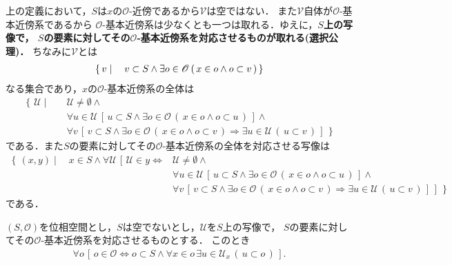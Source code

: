 	上の定義において，$S$は$x$の$\mathscr{O}$-近傍であるから$\mathscr{V}$は空ではない．
	また$\mathscr{V}$自体が$\mathscr{O}$-基本近傍系であるから
	$\mathscr{O}$-基本近傍系は少なくとも一つは取れる．ゆえに，{\bf $S$上の写像で，
	$S$の要素に対してその$\mathscr{O}$-基本近傍系を対応させるものが取れる(選択公理)．}
	ちなみに$\mathscr{V}$とは
	\begin{align}
		\left\{\, v \mid \quad v \subset S \wedge \exists o \in \mathscr{O}\, (\, x \in o \wedge o \subset v\, )\, \right\}
	\end{align}
	なる集合であり，$x$の$\mathscr{O}$-基本近傍系の全体は
	\begin{align}
		\left\{\, \mathscr{U} \mid \quad \right.
		&\mathscr{U} \neq \emptyset \wedge \\
		&\forall u \in \mathscr{U}\, [\, u \subset S \wedge \exists o \in \mathscr{O}\, (\, x \in o \wedge o \subset u\, )\, ] \wedge \\
		&\forall v\, \left.\left[\, v \subset S \wedge \exists o \in \mathscr{O}\, (\, x \in o \wedge o \subset v\, )
		\Longrightarrow \exists u \in \mathscr{U}\, (\, u \subset v\, )\, \right]\, \right\}
	\end{align}
	である．また$S$の要素に対してその$\mathscr{O}$-基本近傍系の全体を対応させる写像は
	\begin{align}
		\left\{\, (x,y) \mid \quad x \in S \wedge
		\forall \mathscr{U}\, \left[\, \mathscr{U} \in y \Longleftrightarrow \right.\right. 
		&\mathscr{U} \neq \emptyset \wedge \\
		&\forall u \in \mathscr{U}\, \left[\, u \subset S \wedge \exists o \in \mathscr{O}\, (\, x \in o \wedge o \subset u\, )\, \right] \wedge \\
		&\forall v\, \left.\left.\left[\, v \subset S \wedge \exists o \in \mathscr{O}\, (\, x \in o \wedge o \subset v\, )
		\Longrightarrow \exists u \in \mathscr{U}\, (\, u \subset v\, )\, \right]\, \right]\, \right\}
	\end{align}
	である．
	
	\begin{screen}
		\begin{thm}[基本近傍系は位相を復元する]
		\label{thm:local_base_defines_open_sets}
			$(S,\mathscr{O})$を位相空間とし，$S$は空でないとし，$\mathscr{U}$を$S$上の写像で，
			$S$の要素に対してその$\mathscr{O}$-基本近傍系を対応させるものとする．
			このとき
			\begin{align}
				\forall o\, \left[\, o \in \mathscr{O} \Longleftrightarrow
				o \subset S \wedge \forall x \in o\, \exists u \in \mathscr{U}_{x}\, (\, u \subset o\, )\, \right].
			\end{align}
		\end{thm}
	\end{screen}
	

